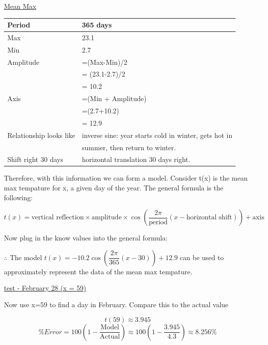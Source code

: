 \documentclass[12pt]{book}
\begin{document}
\begin{enumerate}
\vspace{0.3cm}
\underline{Mean Max}

\vspace{0.3cm}
\begin{tabular}{|l|l|}
    \hline
    Period & 365 days \\
    \hline
    Max & 23.1 \\
    \hline
    Min & 2.7 \\
    \hline
    Amplitude & =(Max-Min)/2\\
    & = (23.1-2.7)/2 \\
    & = 10.2 \\
    \hline
    Axis & =(Min + Amplitude)\\
    & =(2.7+10.2) \\
    & = 12.9 \\
    \hline
    Relationship looks like & inverse sine: year starts cold in winter, gets hot in \\
    & summer, then return to winter. \\
    \hline
    Shift right 30 days & horizontal translation 30 days right. \\
    \hline
\end{tabular}

\newpage

\vspace{0.3cm}
Therefore, with this information we can form a model. 
Consider t(x) is the mean max tempature for x, a given day of the year. 
The general formula is the following:

$$t(x) = \text{vertical reflection} \times \text{amplitude} \times \cos\left( \dfrac{2\pi}{\text{period}}  (x - \text{horizontal shift}) \right) + \text{axis}$$

\begin{center}
    Now plug in the know values into the general formula:
\end{center}

$\therefore$ The model $\boxed{t(x) = -10.2\cos\left( \dfrac{2\pi}{365} (x - 30) \right) + 12.9}$ can be used to approximately represent the data of the mean max tempature.

\vspace{0.3cm}
\underline{test - February 28 (x = 59)}

Now use x=59 to find a day in February. Compare this to the actual value

$$t(59) \approx 3.945$$
\vspace{0.1cm}
$$\% Error = 100\left(1-\dfrac{\text{Model}}{\text{Actual}}\right) \approx 100\left(1-\dfrac{3.945}{4.3}\right) \approx \boxed{8.256\%}$$


\end{enumerate}
\end{document}
